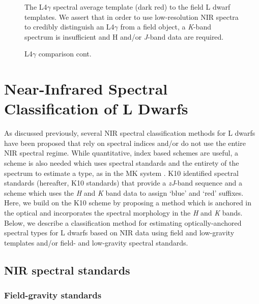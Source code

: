 \documentclass[modern]{aastex61}
\begin{document}
\begin{figure}[b]
    \caption{The L4$\gamma$ spectral average template (dark red) to the field L dwarf templates.
    We assert that in order to use low-resolution NIR spectra to credibly distinguish an L4$\gamma$ from a field object, a \emph{K}-band spectrum is insufficient and H and/or \emph{J}-band data are required.}
    \label{fig:L4lg-field}
\end{figure}

\begin{figure}
     \caption{L4$\gamma$ comparison cont.}
\end{figure}
\clearpage

\section{Near-Infrared Spectral Classification of L Dwarfs}
\label{sec:classification}

As discussed previously, several NIR spectral classification methods for L dwarfs have been proposed that rely on spectral indices and/or do not use the entire NIR spectral regime.
While quantitative, index based schemes are useful, a scheme is also needed which uses spectral standards and the entirety of the spectrum to estimate a type, as in the MK system \citep{Morgan:1984wy,Cushing:2014un}.
K10 identified spectral standards (hereafter, K10 standards) that provide a \emph{zJ}-band sequence and a scheme which uses the \emph{H} and \emph{K} band data to assign `blue' and `red' suffixes.
Here, we build on the K10 scheme by proposing a method which is anchored in the optical and incorporates the spectral morphology in the \emph{H} and \emph{K} bands.
Below, we describe a classification method for estimating optically-anchored spectral types for L dwarfs based on NIR data using field and low-gravity templates and/or field- and low-gravity spectral standards.

\subsection{NIR spectral standards}
\subsubsection{Field-gravity standards}
\label{sec:field_stds}
\end{document}
